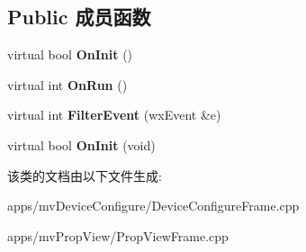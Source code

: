 \subsection*{Public 成员函数}
\begin{DoxyCompactItemize}
\item 
\hypertarget{class_my_app_a79fa75d1155f0e85e20f2869538296d6}{virtual bool {\bfseries On\+Init} ()}\label{class_my_app_a79fa75d1155f0e85e20f2869538296d6}

\item 
\hypertarget{class_my_app_a2f46f736482bf34ea1a2a4837cb8c359}{virtual int {\bfseries On\+Run} ()}\label{class_my_app_a2f46f736482bf34ea1a2a4837cb8c359}

\item 
\hypertarget{class_my_app_a42a5826cbd51ec42f0c6db8ab9983f89}{virtual int {\bfseries Filter\+Event} (wx\+Event \&e)}\label{class_my_app_a42a5826cbd51ec42f0c6db8ab9983f89}

\item 
\hypertarget{class_my_app_a0755bdac4e44e314e62a0f5936ea7a1e}{virtual bool {\bfseries On\+Init} (void)}\label{class_my_app_a0755bdac4e44e314e62a0f5936ea7a1e}

\end{DoxyCompactItemize}


该类的文档由以下文件生成\+:\begin{DoxyCompactItemize}
\item 
apps/mv\+Device\+Configure/Device\+Configure\+Frame.\+cpp\item 
apps/mv\+Prop\+View/Prop\+View\+Frame.\+cpp\end{DoxyCompactItemize}
